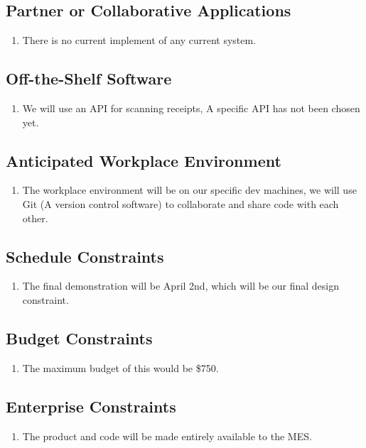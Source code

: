 \documentclass[12pt]{article}
\begin{document}
\subsection{Partner or Collaborative Applications}
\begin{enumerate}
  \item There is no current implement of any current system.
\end{enumerate}
\subsection{Off-the-Shelf Software}
\begin{enumerate}
  \item We will use an API for scanning receipts, A specific API has not been chosen yet.
\end{enumerate}
\subsection{Anticipated Workplace Environment}
\begin{enumerate}
  \item The workplace environment will be on our specific dev machines, we will use Git (A version control software) to collaborate and share code with each other.
\end{enumerate}
\subsection{Schedule Constraints}
\begin{enumerate}
  \item The final demonstration will be April 2nd, which will be our final design constraint.
\end{enumerate}
\subsection{Budget Constraints}
\begin{enumerate}
  \item The maximum budget of this would be \$750.
\end{enumerate}
\subsection{Enterprise Constraints}
\begin{enumerate}
  \item The product and code will be made entirely available to the MES.
\end{enumerate}
\end{document}
